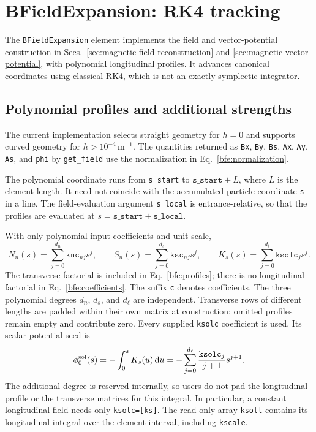 \section{BFieldExpansion: RK4 tracking}
\label{sec:bfield-expansion}
\label{chapter:bfield-expansion}

The \texttt{BFieldExpansion} element implements the field and vector-potential
construction in Secs.~\ref{sec:magnetic-field-reconstruction}
and \ref{sec:magnetic-vector-potential}, with polynomial longitudinal
profiles. It advances canonical coordinates using classical RK4, which is
not an exactly symplectic integrator.

\subsection{Polynomial profiles and additional strengths}

The current implementation selects straight geometry for \(h=0\) and
supports curved geometry for \(h>10^{-4}\,\mathrm{m}^{-1}\).
The quantities returned as \texttt{Bx}, \texttt{By}, \texttt{Bs},
\texttt{Ax}, \texttt{Ay}, \texttt{As}, and \texttt{phi} by
\texttt{get\_field} use the normalization in Eq.~\eqref{bfe:normalization}.

The polynomial coordinate runs from \texttt{s\_start} to
\(\texttt{s\_start}+L\), where \(L\) is the element length. It need not
coincide with the accumulated particle coordinate \texttt{s} in a line.
The field-evaluation argument \texttt{s\_local} is entrance-relative, so
that the profiles are evaluated at
\(s=\texttt{s\_start}+\texttt{s\_local}\).

With only polynomial input coefficients and unit scale,
\begin{equation}
 N_n(s)=\sum_{j=0}^{d_n}\texttt{knc}_{nj}s^j,\qquad
 S_n(s)=\sum_{j=0}^{d_s}\texttt{ksc}_{nj}s^j,\qquad
 K_s(s)=\sum_{j=0}^{d_\ell}\texttt{ksolc}_{j}s^j.
 \label{bfe:coefficients}
\end{equation}
The transverse factorial is included in Eq.~\eqref{bfe:profiles}; there
is no longitudinal factorial in Eq.~\eqref{bfe:coefficients}.
The suffix \texttt{c} denotes coefficients. The three polynomial degrees
\(d_n\), \(d_s\), and \(d_\ell\) are independent. Transverse rows of
different lengths are padded within their own matrix at construction;
omitted profiles remain empty and contribute zero. Every supplied
\texttt{ksolc} coefficient is used. Its scalar-potential seed is
\begin{equation}
 \phi_0^{\mathrm{sol}}(s)
 =-\int_0^s K_s(u)\,\text{d} u
 =-\sum_{j=0}^{d_\ell}\frac{\texttt{ksolc}_{j}}{j+1}s^{j+1}.
\end{equation}
The additional degree is reserved internally, so users do not pad the
longitudinal profile or the transverse matrices for this integral.
In particular, a constant longitudinal field needs only
\texttt{ksolc=[ks]}. The read-only array \texttt{ksoll} contains its
longitudinal integral over the element interval, including \texttt{kscale}.

